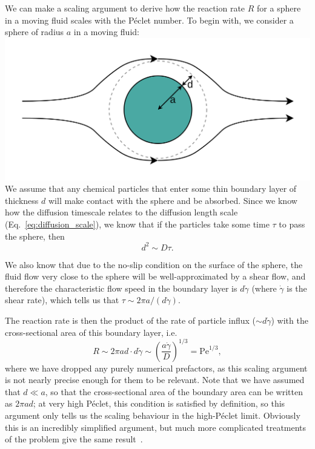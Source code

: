 \clearpage

\begin{kaobox}[title=Reaction rate for a sphere]
    We can make a scaling argument to derive how the reaction rate $R$ for a sphere in a moving fluid scales with the Péclet number. To begin with, we consider a sphere of radius $a$ in a moving fluid:
    \includegraphics[width=\textwidth]{images_other/sphere_scaling_argument.png}
    We assume that any chemical particles that enter some thin boundary layer of thickness $d$ will make contact with the sphere and be absorbed. Since we know how the diffusion timescale relates to the diffusion length scale (Eq.~\eqref{eq:diffusion_scale}), we know that if the particles take some time $\tau$ to pass the sphere, then
    \begin{equation*}
        d^2 \sim D \tau.
    \end{equation*}
    
    We also know that due to the no-slip condition on the surface of the sphere, the fluid flow very close to the sphere will be well-approximated by a shear flow, and therefore the characteristic flow speed in the boundary layer is $d\dot\gamma$ (where $\dot\gamma$ is the shear rate), which tells us that $\tau \sim 2\pi a/(d\dot\gamma)$.
    
    The reaction rate is then the product of the rate of particle influx ($\sim d\dot\gamma$) with the cross-sectional area of this boundary layer, i.e.
    \begin{equation*}
        R \sim 2\pi a d \cdot d\dot\gamma \sim \left( \frac{a\dot\gamma}{D} \right)^{1/3} = \mathrm{Pe}^{1/3},
    \end{equation*}
    where we have dropped any purely numerical prefactors, as this scaling argument is not nearly precise enough for them to be relevant. Note that we have assumed that $d \ll a$, so that the cross-sectional area of the boundary area can be written as $2\pi ad$; at very high Péclet, this condition is satisfied by definition, so this argument only tells us the scaling behaviour in the high-Péclet limit. Obviously this is an incredibly simplified argument, but much more complicated treatments of the problem give the same result~\cite{bowman_mass_1961}.
    

\end{kaobox}
